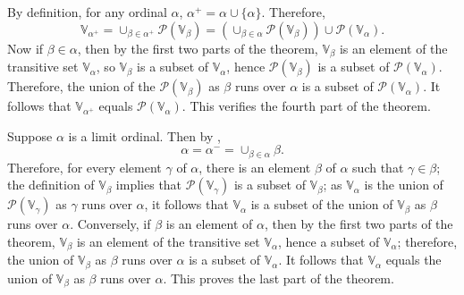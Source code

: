 \documentclass{article}
\begin{document}
By definition, for any ordinal \(\alpha\),
\(\alpha^+ = \alpha \cup \{ \alpha \}\).  Therefore,
\begin{displaymath}
  \mathbb{V}_{\alpha^+} =
  \cup_{\beta \in \alpha^+} \mathcal{P}(\mathbb{V}_\beta) =
  (\cup_{\beta \in \alpha} \mathcal{P}(\mathbb{V}_\beta)) \cup
  \mathcal{P}(\mathbb{V}_\alpha).
\end{displaymath}
Now if \(\beta \in \alpha\), then by the first two parts of the
theorem, \(\mathbb{V}_\beta\) is an element of the transitive set
\(\mathbb{V}_\alpha\), so \(\mathbb{V}_\beta\) is a subset of
\(\mathbb{V}_\alpha\), hence \(\mathcal{P}(\mathbb{V}_\beta)\) is a
subset of \(\mathcal{P}(\mathbb{V}_\alpha)\).  Therefore, the union of
the \(\mathcal{P}(\mathbb{V}_\beta)\) as \(\beta\) runs over
\(\alpha\) is a subset of \(\mathcal{P}(\mathbb{V}_\alpha)\).  It
follows that \(\mathbb{V}_{\alpha^+}\) equals
\(\mathcal{P}(\mathbb{V}_\alpha)\).  This verifies the fourth part of
the theorem.

Suppose \(\alpha\) is a limit ordinal.  Then by ,
\begin{displaymath}
  \alpha = \alpha^- = \cup_{\beta \in \alpha} \beta.
\end{displaymath}
Therefore, for every element \(\gamma\) of \(\alpha\), there is an
element \(\beta\) of \(\alpha\) such that \(\gamma \in \beta\); the
definition of \(\mathbb{V}_\beta\) implies that
\(\mathcal{P}(\mathbb{V}_\gamma)\) is a subset of
\(\mathbb{V}_\beta\); as \(\mathbb{V}_\alpha\) is the union of
\(\mathcal{P}(\mathbb{V}_\gamma)\) as \(\gamma\) runs over \(\alpha\),
it follows that \(\mathbb{V}_\alpha\) is a subset of the union of
\(\mathbb{V}_\beta\) as \(\beta\) runs over \(\alpha\).  Conversely,
if \(\beta\) is an element of \(\alpha\), then by the first two parts
of the theorem, \(\mathbb{V}_\beta\) is an element of the transitive
set \(\mathbb{V}_\alpha\), hence a subset of \(\mathbb{V}_\alpha\);
therefore, the union of \(\mathbb{V}_\beta\) as \(\beta\) runs over
\(\alpha\) is a subset of \(\mathbb{V}_\alpha\).  It follows that
\(\mathbb{V}_\alpha\) equals the union of \(\mathbb{V}_\beta\) as
\(\beta\) runs over \(\alpha\).  This proves the last part of the
theorem.
\end{document}
